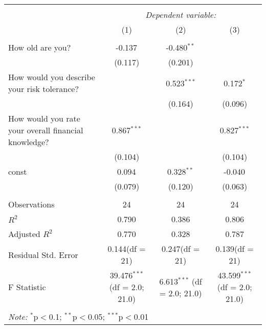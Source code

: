 \documentclass{article}
\begin{document}
\begin{adjustbox}{max width=\paperwidth-2cm,center}

\begin{tabular}{|l|c|c|c|}
\\[-1.8ex]\hline
\hline \\[-1.8ex]
& \multicolumn{3}{c|}{\textit{Dependent variable:}} \

\\[-1.8ex] & (1) & (2) & (3) \\
\hline \\[-1.8ex]
 How old are you? & -0.137$^{}$ & -0.480$^{**}$ & \\
  & (0.117) & (0.201) & \\
 How would you describe your risk tolerance? & & 0.523$^{***}$ & 0.172$^{*}$ \\
  & & (0.164) & (0.096) \\
 How would you rate your overall financial knowledge? & 0.867$^{***}$ & & 0.827$^{***}$ \\
  & (0.104) & & (0.104) \\
 const & 0.094$^{}$ & 0.328$^{**}$ & -0.040$^{}$ \\
  & (0.079) & (0.120) & (0.063) \\
\hline \\[-1.8ex]
 Observations & 24 & 24 & 24 \\
 $R^2$ & 0.790 & 0.386 & 0.806 \\
 Adjusted $R^2$ & 0.770 & 0.328 & 0.787 \\
 Residual Std. Error & 0.144(df = 21) & 0.247(df = 21) & 0.139(df = 21)  \\
 F Statistic & 39.476$^{***}$ (df = 2.0; 21.0) & 6.613$^{***}$ (df = 2.0; 21.0) & 43.599$^{***}$ (df = 2.0; 21.0) \\
\hline
\hline \\[-1.8ex]
\multicolumn{4}{|l|}{\textit{Note:} $^{*}$p$<$0.1; $^{**}$p$<$0.05; $^{***}$p$<$0.01} \\
\hline
\end{tabular}
\end{adjustbox}
\end{document}
